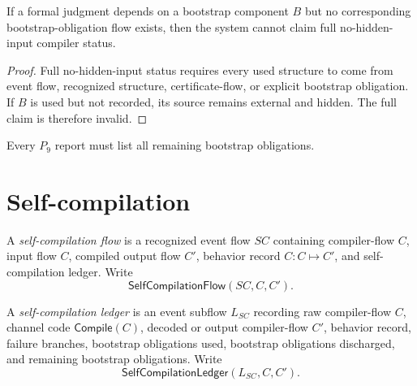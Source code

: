 \begin{theorem}
\label{thm:self-hosting-invisible-bootstrap-invalid}
If a formal judgment depends on a bootstrap component $B$ but no corresponding bootstrap-obligation flow exists, then the system cannot claim full no-hidden-input compiler status.
\end{theorem}

\begin{proof}
Full no-hidden-input status requires every used structure to come from event flow, recognized structure, certificate-flow, or explicit bootstrap obligation. If $B$ is used but not recorded, its source remains external and hidden. The full claim is therefore invalid.
\end{proof}

\begin{corollary}
\label{cor:self-hosting-bootstrap-boundary-reportable}
Every $P_9$ report must list all remaining bootstrap obligations.
\end{corollary}

\section{Self-compilation}
\label{sec:self-hosting-self-compilation}

\begin{definition}
\label{def:self-hosting-self-compilation-flow}
A \emph{self-compilation flow} is a recognized event flow $SC$ containing compiler-flow $C$, input flow $C$, compiled output flow $C'$, behavior record $C:C\mapsto C'$, and self-compilation ledger. Write
$$
  \mathsf{SelfCompilationFlow}(SC,C,C').
$$
\end{definition}

\begin{definition}
\label{def:self-hosting-self-compilation-ledger}
A \emph{self-compilation ledger} is an event subflow $L_{SC}$ recording raw compiler-flow $C$, channel code $\mathsf{Compile}(C)$, decoded or output compiler-flow $C'$, behavior record, failure branches, bootstrap obligations used, bootstrap obligations discharged, and remaining bootstrap obligations. Write
$$
  \mathsf{SelfCompilationLedger}(L_{SC},C,C').
$$
\end{definition}

